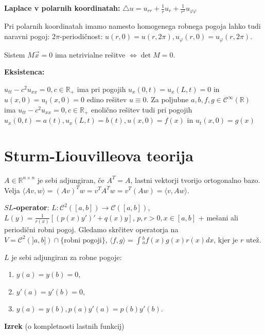 \documentclass[10pt,a4paper]{amsart}
\theoremstyle{definition} %
\theoremstyle{plain} %
\let\oldint\int
\renewcommand{\int}{\oldint \!}
\newcommand{\R}{\mathbb R}
\begin{document}
\textbf{Laplace v polarnih koordinatah:} $\triangle u = u_{rr} + \frac{1}{r}u_r + \frac{1}{r^2}u_{\varphi \varphi}$

Pri polarnih koordinatah imamo namesto homogenega robnega pogoja lahko tudi naravni pogoj: $2\pi$-periodičnost: $u(r,0) = u(r,2\pi), u_\varphi (r,0) = u_\varphi (r,2\pi)$.

Sistem $M\vec{x} = 0 $ ima netrivialne rešitve $\Longleftrightarrow \det{M} = 0$.

\textbf{Eksistenca:}

$u_{tt}-c^2u_{xx}=0, c \in \R_+$ ima pri pogojih $u_x(0,t) = u_x(L,t)=0$ in $u(x,0) = u_t(x,0) = 0$ edino rešitev $u \equiv 0$. Za poljubne $a,b,f,g \in \mathcal{C}^\infty (\R)$ ima $u_{tt}-c^2u_{xx}=0, c \in \R_+$ enolično rešitev tudi pri pogojih $u_x(0,t) = a(t),u _x(L,t)=b(t), u(x,0) = f(x)$ in $u_t(x,0) = g(x)$

\vspace{-.4cm}  %

\section*{Sturm-Liouvilleova teorija}

$A \in \R^{n \times n}$ je sebi adjungiran, če $A^T = A$, lastni vektorji tvorijo ortogonalno bazo. Velja $\langle Av,w \rangle = (Av)^Tw = v^TA^Tw = v^T(Aw) = \langle v,Aw \rangle$.

\textbf{$SL$-operator}: $L:\mathcal{C}^2([a,b])\longrightarrow \mathcal{C}([a,b])$, $L(y) = \frac{1}{r(x)}[(p(x)y')'+q(x)y]$, $p,r > 0, x \in [a,b]$ + mešani ali periodični robni pogoj. Gledamo skrčitev operatorja na $V = \mathcal{C}^2(]a,b]) \cap \{\text{robni pogoji}\}$, $\langle f,g\rangle = \int_a^bf(x)g(x)r(x)dx$, kjer je $r$ utež.

$L$ je sebi adjungiran za robne pogoje:

\begin{enumerate}
\item $y(a)=y(b)=0$,
\item $y'(a)=y'(b)=0$,
\item $y(a)=y(b), p(a)y'(a)=p(b)y'(b)$.
\end{enumerate}

\textbf{Izrek} (o kompletnosti lastnih funkcij)
\end{document}
